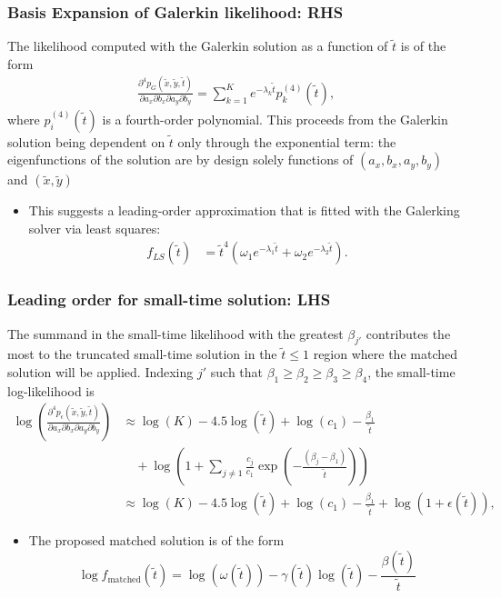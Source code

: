 \documentclass{beamer}
\begin{document}
\begin{frame}
  \frametitle{Basis Expansion of Galerkin likelihood: RHS}
  The likelihood computed with the Galerkin solution as a
function of $\tilde{t}$ is of the form
\begin{align*}
  \frac{\partial^4 p_{G}(\tilde{x}, \tilde{y}, \tilde{t})}{\partial a_x
  \partial b_x \partial a_y \partial b_y} = \sum_{k=1}^{K} e^{-\lambda_k\tilde{t}} p_k^{(4)}(\tilde{t}),
\end{align*}
where $p_i^{(4)}(\tilde{t})$ is a fourth-order polynomial. This
proceeds from the Galerkin solution being dependent on $\tilde{t}$
only through the exponential term: the eigenfunctions of the solution
are by design solely functions of $(a_x, b_x, a_y, b_y)$ and
$(\tilde{x}, \tilde{y})$


\begin{itemize}
\item This suggests a leading-order approximation that is fitted with the Galerking solver via least squares:
  \begin{align*}
    f_{LS}(\tilde{t}) &= \tilde{t}^4 \left( \omega_1 e^{-\lambda_1\tilde{t}} + \omega_2 e^{-\lambda_2\tilde{t}}\right).
  \end{align*}
\end{itemize}
\end{frame}
\begin{frame}
  \frametitle{Leading order for small-time solution: LHS}

  The summand in the small-time likelihood with the greatest
  $\beta_{j'}$ contributes the most to the truncated small-time
  solution in the $\tilde{t} \leq 1$ region where the matched solution
  will be applied. Indexing $j'$ such that
  $\beta_1 \geq \beta_2 \geq \beta_3 \geq \beta_4$, the small-time
  log-likelihood is
\begin{align*}
  \log\left( \frac{\partial^4 p_\epsilon(\tilde{x}, \tilde{y}, \tilde{t})}{\partial a_x
  \partial b_x \partial a_y \partial b_y} \right) &\approx \log(K) - 4.5\log(\tilde{t}) + \log(c_1) - \frac{\beta_1}{\tilde{t}} \nonumber \\
  &\quad + \log\left(1 + \sum_{j \neq 1} \frac{c_j}{c_1}\exp\left( -\frac{(\beta_j-\beta_1)}{\tilde{t}} \right) \right) \nonumber \\
  &\approx \log(K) - 4.5\log(\tilde{t}) + \log(c_1) - \frac{\beta_1}{\tilde{t}} + \log\left(1 + \epsilon(\tilde{t}) \right), 
\end{align*}

  \begin{itemize}
\item The proposed matched solution is of the form
  \[
    \log f_{\mbox{matched}}(\tilde{t}) = \log(\omega(\tilde{t})) -
    \gamma(\tilde{t})\log(\tilde{t}) -
    \frac{\beta(\tilde{t})}{\tilde{t}}
  \]
  \end{itemize}
\end{frame}
\end{document}
